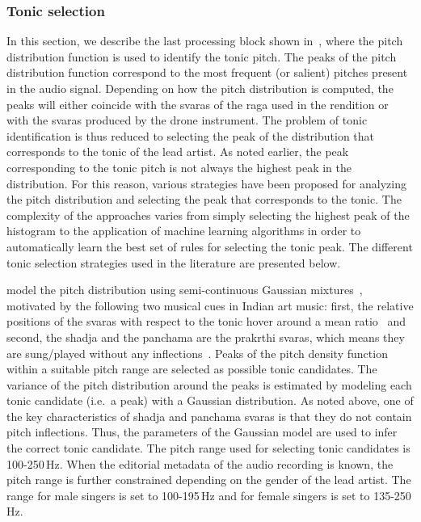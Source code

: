 \subsubsection{Tonic selection}
\label{sec:tonic_selection}

In this section, we describe the last processing block shown in~, where the pitch distribution function is used to identify the tonic pitch. The peaks of the pitch distribution function correspond to the most frequent (or salient) pitches present in the audio signal. Depending on how the pitch distribution is computed, the peaks will either coincide with the \glspl{svara} of the \gls{raga} used in the rendition or with the \glspl{svara} produced by the drone instrument. The problem of tonic identification is thus reduced to selecting the peak of the distribution that corresponds to the tonic of the lead artist. As noted earlier, the peak corresponding to the tonic pitch is not always the highest peak in the distribution. For this reason, various strategies have been proposed for analyzing the pitch distribution and selecting the peak that corresponds to the tonic. The complexity of the approaches varies from simply selecting the highest peak of the histogram to the application of machine learning algorithms in order to automatically learn the best set of rules for selecting the tonic peak. The different tonic selection strategies used in the literature are presented below.

\cite{ranjani2011carnatic} model the pitch distribution using semi-continuous Gaussian mixtures~\citep{Huang2001}, motivated by the following two musical cues in Indian art music: first, the relative positions of the \glspl{svara} with respect to the tonic hover around a mean ratio~\citep{Krishnaswamy2003} and second, the \gls{shadja} and the \gls{panchama} are the prakrthi \glspl{svara}, which means they are sung/played without any inflections~\citep{Manikandan2004,Krishnaswamyicassp2003}. Peaks of the pitch density function within a suitable pitch range are selected as possible tonic candidates. The variance of the pitch distribution around the peaks is estimated by modeling each tonic candidate (i.e.~a peak) with a Gaussian distribution. As noted above, one of the key characteristics of \gls{shadja} and \gls{panchama} \glspl{svara} is that they do not contain pitch inflections. Thus, the parameters of the Gaussian model are used to infer the correct tonic candidate. The pitch range used for selecting tonic candidates is 100-250\,Hz. When the editorial metadata of the audio recording is known, the pitch range is further constrained depending on the gender of the lead artist. The range for male singers is set to 100-195\,Hz and for female singers is set to 135-250\,Hz.

